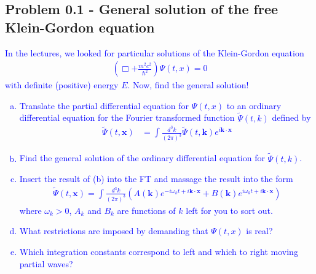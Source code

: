 \documentclass[../main.tex]{subfiles}
\begin{document}
\subsection{Problem 0.1 - General solution of the free Klein-Gordon equation}
\textcolor{blue}{In the lectures, we looked for particular solutions of the Klein-Gordon equation
\begin{align}
\left(\Box+\frac{m^2c^2}{\hbar^2}\right)\Psi(t,x)=0
\end{align}
with definite (positive) energy $E$. Now, find the general solution!
\begin{enumerate}[(a)]
\item Translate the partial differential equation for $\Psi(t,x)$ to an ordinary differential equation for the Fourier transformed function $\tilde\Psi(t,k)$ defined by
\begin{align}
\tilde{\Psi}(t,\mathbf{x})
&=\int\frac{d^3k}{(2\pi)^3}\tilde{\Psi}(t,\mathbf{k})e^{i\mathbf{k\cdot x}}
\end{align}
\item Find the general solution of the ordinary differential equation for $\tilde\Psi(t,k)$.
\item Insert the result of (b) into the FT and massage the result into the form
\begin{align}
\tilde{\Psi}(t,\mathbf{x})=\int\frac{d^3k}{(2\pi)^3}\left(A(\mathbf{k})e^{-i\omega_kt+i\mathbf{k\cdot x}}+B(\mathbf{k})e^{i\omega_kt+i\mathbf{k\cdot x}}\right)
\end{align}
where $\omega_k>0$, $A_k$ and $B_k$ are functions of $k$ left for you to sort out.
\item What restrictions are imposed by demanding that  $\Psi(t,x)$ is real?
\item Which integration constants correspond to left and which to right moving partial waves?
\end{enumerate}
}
\end{document}
